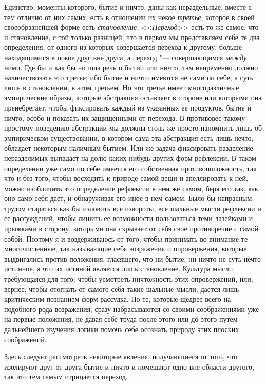 Единство, моменты которого, бытие и ничто, даны как нераздельные, вместе с
тем отлично от них самих, есть в отношении их некое
{\em третье}, которое в своей своеобразнейшей форме
есть {\em становление}.
<<{\em Переход}>> есть то же самое, что и становление, с
той только разницей, что в первом мы представляем себе те два определения,
от одного из которых совершается переход к другому, больше находящимися в
покое друг вне друга, а переход "--- совершающимся
{\em между} ними. Где бы и как бы ни шла речь о бытии
или ничто, там непременно должно наличествовать это третье; ибо бытие и
ничто имеются не сами по себе, а суть лишь в становлении, в этом третьем.
Но это третье имеет многоразличные эмпирические образы, которые абстракция
оставляет в стороне или которыми она пренебрегает, чтобы фиксировать каждый
из указанных ее продуктов, бытие и ничто, особо и показать их защищенными
от перехода. В противовес такому простому поведению абстракции мы должны
столь же просто напомнить лишь об эмпирическом существовании, в котором
сама эта абстракция есть лишь нечто, обладает некоторым наличным бытием.
Или же задача фиксировать разделение неразделимых выпадает на долю
каких-нибудь других форм рефлексии. В таком определении уже само по себе
имеется его собственная противоположность, так что и без того, чтобы
восходить к природе самой вещи и апеллировать к ней, можно изобличить это
определение рефлексии в нем же самом, беря его так, как оно само себя дает,
и обнаруживая его иное в нем самом. Было бы напрасным трудом стараться
как бы изловить все извороты, все шальные мысли рефлексии и ее рассуждений,
чтобы лишить ее возможности пользоваться теми лазейками и прыжками в
сторону, которыми она скрывает от себя свое противоречие с самой собой.
Поэтому я и воздерживаюсь от того, чтобы принимать во внимание те
многочисленные, так называющие себя возражения и опровержения, которые
выдвигались против положения, гласящего, что ни бытие, ни ничто не суть
нечто истинное, а что их истиной является лишь становление. Культура мысли,
требующаяся для того, чтобы усмотреть ничтожность этих опровержений, или,
вернее, чтобы отогнать от самого себя такие шальные мысли, дается лишь
критическим познанием форм рассудка. Но те, которые щедрее всего на
подобного рода возражения, сразу набрасываются со своими соображениями уже
на первые положения, не давая себе труда после этого или до этого путем
дальнейшего изучения логики помочь себе осознать природу этих плоских
соображений.

Здесь следует рассмотреть некоторые явления, получающиеся от того, что
изолируют друг от друга бытие и ничто и помещают одно вне области другого,
так что тем самым отрицается переход.

